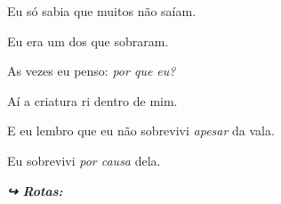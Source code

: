 \noindent Eu só sabia que muitos não saíam.

\noindent Eu era um dos que sobraram.

\noindent As vezes eu penso: \textit{por que eu?}

\noindent Aí a criatura ri dentro de mim.

\noindent E eu lembro que eu não sobrevivi \textit{apesar} da vala.

\noindent Eu sobrevivi \textit{por causa} dela.

\vspace{0.5em}
\noindent\textit{\textbf{↪ Rotas:}  \rotasep {}}
